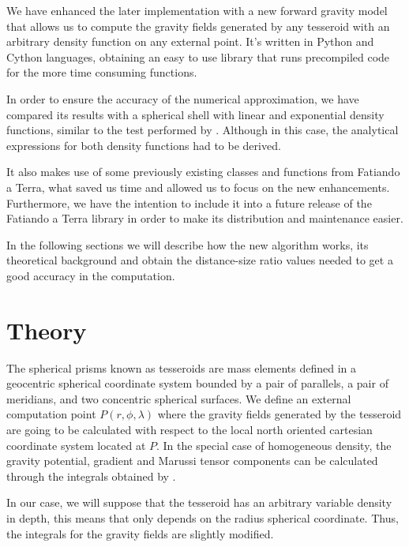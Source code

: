 \documentclass[extra]{gji}
\begin{document}
We have enhanced the later implementation with a new forward gravity model that allows us to compute the gravity fields generated by any tesseroid with an arbitrary density function on any external point.
It's written in Python and Cython languages, obtaining an easy to use library that runs precompiled code for the more time consuming functions.

In order to ensure the accuracy of the numerical approximation, we have compared its results with a spherical shell with linear and exponential density functions, similar to the test performed by \cite{Uieda2016}. Although in this case, the analytical expressions for both density functions had to be derived.

It also makes use of some previously existing classes and functions from Fatiando a Terra, what saved us time and allowed us to focus on the new enhancements. Furthermore, we have the intention to include it into a future release of the Fatiando a Terra library in order to make its distribution and maintenance easier.

In the following sections we will describe how the new algorithm works, its theoretical background and obtain the distance-size ratio values needed to get a good accuracy in the computation.


\section{Theory}

The spherical prisms known as tesseroids are mass elements defined in a geocentric spherical coordinate system bounded by a pair of parallels, a pair of  meridians, and two concentric spherical surfaces.
We define an external computation point $P(r, \phi, \lambda)$ where the gravity fields generated by the tesseroid are going to be calculated with respect to the local north oriented cartesian coordinate system located at $P$.
In the special case of homogeneous density, the gravity potential, gradient and Marussi tensor components can be calculated through the integrals obtained by \citet{Grombein2013} \citep[see also][]{Uieda2016}.

In our case, we will suppose that the tesseroid has an arbitrary variable density in depth, this means that only depends on the radius spherical coordinate. Thus, the integrals for the gravity fields are slightly modified.
\end{document}
